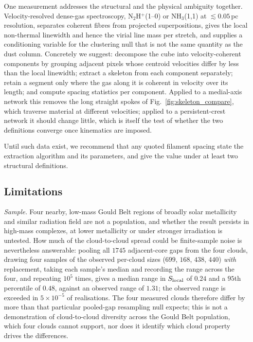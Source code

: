 \documentclass[usenatbib,twoside,twocolumn]{mnras}
\begin{document}
One measurement addresses the structural and the physical ambiguity together. Velocity-resolved dense-gas spectroscopy, N$_2$H$^+$(1--0) or NH$_3$(1,1) at $\lesssim0.05$\,pc resolution, separates coherent fibres from projected superpositions, gives the local non-thermal linewidth and hence the virial line mass per stretch, and supplies a conditioning variable for the clustering null that is not the same quantity as the dust column. Concretely we suggest: decompose the cube into velocity-coherent components by grouping adjacent pixels whose centroid velocities differ by less than the local linewidth; extract a skeleton from each component separately; retain a segment only where the gas along it is coherent in velocity over its length; and compute spacing statistics per component. Applied to a medial-axis network this removes the long straight spokes of Fig.~\ref{fig:skeleton_compare}, which traverse material at different velocities; applied to a persistent-crest network it should change little, which is itself the test of whether the two definitions converge once kinematics are imposed.

Until such data exist, we recommend that any quoted filament spacing state the extraction algorithm and its parameters, and give the value under at least two structural definitions.

\subsection{Limitations}
\label{sec:limitations}


\emph{Sample.} Four nearby, low-mass Gould Belt regions of broadly solar metallicity and similar radiation field are not a population, and whether the result persists in high-mass complexes, at lower metallicity or under stronger irradiation is untested. How much of the cloud-to-cloud spread could be finite-sample noise is nevertheless answerable: pooling all $1745$ adjacent-core gaps from the four clouds, drawing four samples of the observed per-cloud sizes ($699$, $168$, $438$, $440$) \emph{with} replacement, taking each sample's median and recording the range across the four, and repeating $10^{5}$ times, gives a median range in $S_{\rm local}$ of $0.24$ and a $95$th percentile of $0.48$, against an observed range of $1.31$; the observed range is exceeded in $5\times10^{-5}$ of realisations. The four measured clouds therefore differ by more than that particular pooled-gap resampling null expects; this is not a demonstration of cloud-to-cloud diversity across the Gould Belt population, which four clouds cannot support, nor does it identify which cloud property drives the differences.
\end{document}

